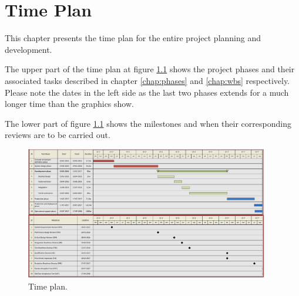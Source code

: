 \chapter{Time Plan}
This chapter presents the time plan for the entire project planning and development. 

The upper part of the time plan at figure \ref{fig:timeplan} shows the project phases and their associated tasks described in chapter \ref{chap:phases} and \ref{chap:wbs} respectively. Please note the dates in the left side as the last two phases extends for a much longer time than the graphics show. 

The lower part of figure \ref{fig:timeplan} shows the milestones and when their corresponding reviews are to be carried out. 

\begin{figure}[H]
\centering
\includegraphics[width=0.95\textwidth]
{Billeder/Tidsplan.pdf}
\caption{Time plan.}
\label{fig:timeplan}
\end{figure}

